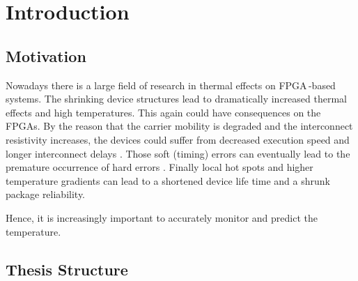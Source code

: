  
\chapter{Introduction}
\label{ch:intro}
\section{Motivation}
Nowadays there is a large field of research in thermal effects on \ac{FPGA}\,-based systems. The shrinking device structures lead to dramatically increased thermal effects and high temperatures. This again could have consequences on the \acp{FPGA}. By the reason that the carrier mobility is degraded and the interconnect resistivity increases, the devices could suffer from decreased execution speed and longer interconnect delays \cite{Huang2006}. Those soft (timing) errors can eventually lead to the premature occurrence of hard errors \cite{Borkar2005}. Finally local hot spots and higher temperature gradients can lead to a shortened device life time and a shrunk package reliability. 

Hence, it is increasingly important to accurately monitor and predict the temperature. 


\section{Thesis Structure}
